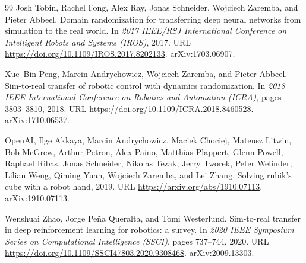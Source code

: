 \documentclass[10pt]{article}
\begin{document}
\begin{thebibliography}{99}
Josh Tobin, Rachel Fong, Alex Ray, Jonas Schneider, Wojciech Zaremba, and
  Pieter Abbeel.
\newblock Domain randomization for transferring deep neural networks from
  simulation to the real world.
\newblock In \emph{2017 IEEE/RSJ International Conference on Intelligent Robots
  and Systems (IROS)}, 2017.
\newblock URL \url{https://doi.org/10.1109/IROS.2017.8202133}.
\newblock arXiv:1703.06907.

Xue~Bin Peng, Marcin Andrychowicz, Wojciech Zaremba, and Pieter Abbeel.
\newblock Sim-to-real transfer of robotic control with dynamics randomization.
\newblock In \emph{2018 IEEE International Conference on Robotics and
  Automation (ICRA)}, pages 3803--3810, 2018.
\newblock URL \url{https://doi.org/10.1109/ICRA.2018.8460528}.
\newblock arXiv:1710.06537.

{OpenAI}, Ilge Akkaya, Marcin Andrychowicz, Maciek Chociej, Mateusz Litwin, Bob
  McGrew, Arthur Petron, Alex Paino, Matthias Plappert, Glenn Powell, Raphael
  Ribas, Jonas Schneider, Nikolas Tezak, Jerry Tworek, Peter Welinder, Lilian
  Weng, Qiming Yuan, Wojciech Zaremba, and Lei Zhang.
\newblock Solving rubik's cube with a robot hand, 2019.
\newblock URL \url{https://arxiv.org/abs/1910.07113}.
\newblock arXiv:1910.07113.

Wenshuai Zhao, Jorge Pe\~na Queralta, and Tomi Westerlund.
\newblock Sim-to-real transfer in deep reinforcement learning for robotics: a
  survey.
\newblock In \emph{2020 IEEE Symposium Series on Computational Intelligence
  (SSCI)}, pages 737--744, 2020.
\newblock URL \url{https://doi.org/10.1109/SSCI47803.2020.9308468}.
\newblock arXiv:2009.13303.

\end{thebibliography}
\end{document}
